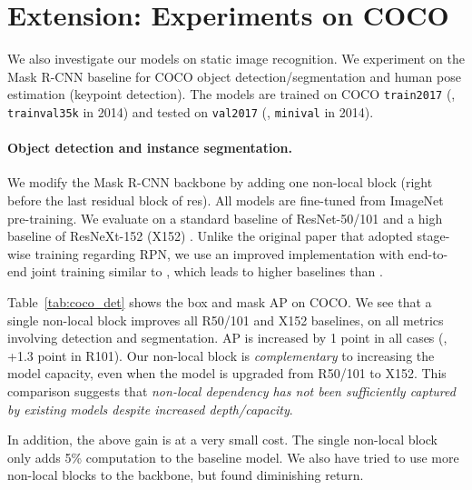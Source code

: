 \documentclass[10pt,twocolumn,letterpaper]{article}
\begin{document}
\vspace{-0.5em}
\section{Extension: Experiments on COCO}
\vspace{-0.5em}
We also investigate our models on static image recognition.
We experiment on the Mask R-CNN baseline \cite{He2017} for COCO \cite{Lin2014} object detection/segmentation and human pose estimation (keypoint detection). The models are trained on COCO \texttt{train2017} (\ie, \texttt{trainval35k} in 2014) and tested on \texttt{val2017} (\ie, \texttt{minival} in 2014).

\paragraph{Object detection and instance segmentation.}

We modify the Mask R-CNN backbone by adding one non-local block (right before the last residual block of res). All models are fine-tuned from ImageNet pre-training. We evaluate on a standard baseline of ResNet-50/101 and a high baseline of ResNeXt-152 (X152) \cite{Xie2017}. Unlike the original paper \cite{He2017} that adopted stage-wise training regarding RPN, we use an improved implementation with end-to-end joint training similar to \cite{Ren2017}, which leads to higher baselines than \cite{He2017}.

Table~\ref{tab:coco_det} shows the box and mask AP on COCO. We see that a single non-local block improves all R50/101 and X152 baselines, on all metrics involving detection and segmentation. AP is increased by 1 point in all cases (\eg, +1.3 point in R101). Our non-local block is \emph{complementary} to increasing the model capacity, even when the model is upgraded from R50/101 to X152. This comparison suggests that \emph{non-local dependency has not been sufficiently captured by existing models despite increased depth/capacity}.

In addition, the above gain is at a very small cost. The single non-local block only adds 5\% computation to the baseline model. We also have tried to use more non-local blocks to the backbone, but found diminishing return.
\end{document}
